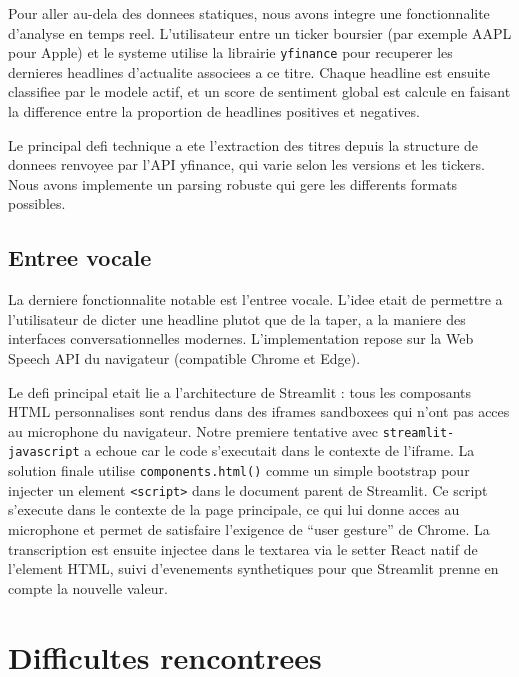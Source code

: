 \documentclass[12pt, a4paper]{article}
\begin{document}
Pour aller au-dela des donnees statiques, nous avons integre une fonctionnalite
d'analyse en temps reel. L'utilisateur entre un ticker boursier (par exemple AAPL
pour Apple) et le systeme utilise la librairie \texttt{yfinance} pour recuperer les
dernieres headlines d'actualite associees a ce titre. Chaque headline est ensuite
classifiee par le modele actif, et un score de sentiment global est calcule en
faisant la difference entre la proportion de headlines positives et negatives.

Le principal defi technique a ete l'extraction des titres depuis la structure de
donnees renvoyee par l'API yfinance, qui varie selon les versions et les tickers.
Nous avons implemente un parsing robuste qui gere les differents formats possibles.

\subsection{Entree vocale}

La derniere fonctionnalite notable est l'entree vocale. L'idee etait de permettre
a l'utilisateur de dicter une headline plutot que de la taper, a la maniere des
interfaces conversationnelles modernes. L'implementation repose sur la Web Speech
API du navigateur (compatible Chrome et Edge).

Le defi principal etait lie a l'architecture de Streamlit : tous les composants
HTML personnalises sont rendus dans des iframes sandboxees qui n'ont pas acces au
microphone du navigateur. Notre premiere tentative avec \texttt{streamlit-javascript}
a echoue car le code s'executait dans le contexte de l'iframe. La solution finale
utilise \texttt{components.html()} comme un simple bootstrap pour injecter un
element \texttt{<script>} dans le document parent de Streamlit. Ce script s'execute
dans le contexte de la page principale, ce qui lui donne acces au microphone et
permet de satisfaire l'exigence de ``user gesture'' de Chrome. La transcription est
ensuite injectee dans le textarea via le setter React natif de l'element HTML, suivi
d'evenements synthetiques pour que Streamlit prenne en compte la nouvelle valeur.

\section{Difficultes rencontrees}
\end{document}
